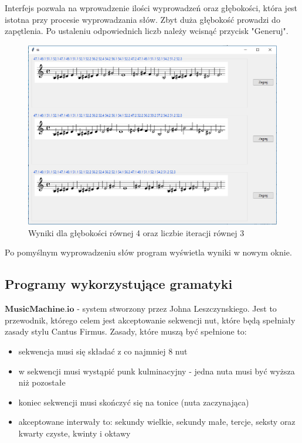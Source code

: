 	Interfejs pozwala na wprowadzenie ilości wyprowadzeń oraz głębokości, która jest istotna przy procesie wyprowadzania słów. Zbyt duża głębokość prowadzi do zapętlenia. Po ustaleniu odpowiednich liczb należy wcisnąć przycisk "Generuj".
	
	\begin{figure}[H]
		\centering
		\includegraphics[width=0.7\linewidth]{grammar_parser_gui_results}
		\caption{Wyniki dla głębokości równej 4 oraz liczbie iteracji równej 3}
		\label{fig:grammarparserguiresults}
	\end{figure}

	Po pomyślnym wyprowadzeniu słów program wyświetla wyniki w nowym oknie. 
	



\subsection{Programy wykorzystujące gramatyki}

$\textbf{MusicMachine.io}$ - system stworzony przez Johna Leszczynskiego. Jest to przewodnik, którego celem jest akceptowanie sekwencji nut, które będą spełniały zasady stylu Cantus Firmus. Zasady, które muszą być spełnione to:

\begin{itemize}
	\item sekwencja musi się składać z co najmniej 8 nut
	\item w sekwencji musi wystąpić punk kulminacyjny - jedna nuta musi być wyższa niż pozostałe
	\item koniec sekwencji musi skończyć się na tonice (nuta zaczynająca)
	\item akceptowane interwały to: sekundy wielkie, sekundy małe, tercje, seksty oraz kwarty czyste, kwinty i oktawy
\end{itemize}

